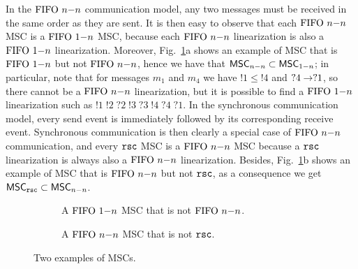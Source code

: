 In the $\text{FIFO } n\mathsf{-}n$ communication model, any two messages must be received in the same order as they are sent. It is then easy to observe that each $\text{FIFO } n\mathsf{-}n$ MSC is a $\text{FIFO } 1\mathsf{-}n$ MSC, because each $\text{FIFO } n\mathsf{-}n$ linearization is also a $\text{FIFO } 1\mathsf{-}n$ linearization. Moreover, Fig.~\ref{fig:onen_nn_rsc_ex}a shows an example of MSC that is $\text{FIFO } 1\mathsf{-}n$ but not $\text{FIFO } n\mathsf{-}n$, hence we have that $\mathsf{MSC}_{n\mathsf{-}n} \subset \mathsf{MSC}_{1\mathsf{-}n}$; in particular, note that for messages $m_1$ and $m_4$ we have $!1 \le !4$ and $?4 \to ?1$, so there cannot be a $\text{FIFO } n\mathsf{-}n$ linearization, but it is possible to find a $\text{FIFO } 1\mathsf{-}n$ linearization such as $!1\;!2\;?2\;!3\;?3\;!4\;?4\;?1$. In the synchronous communication model, every send event is immediately followed by its corresponding receive event. Synchronous communication is then clearly a special case of $\text{FIFO } n\mathsf{-}n$ communication, and every $\mathtt{rsc}$ MSC is a $\text{FIFO } n\mathsf{-}n$ MSC because a $\mathtt{rsc}$ linearization is always also a $\text{FIFO } n\mathsf{-}n$ linearization. Besides, Fig.~\ref{fig:onen_nn_rsc_ex}b shows an example of MSC that is $\text{FIFO } n\mathsf{-}n$ but not $\mathtt{rsc}$, as a consequence we get $\mathsf{MSC}_{\mathtt{rsc}} \subset \mathsf{MSC}_{n\mathsf{-}n}$.

\begin{figure}[h]
	\captionsetup[subfigure]{justification=centering}
	\begin{subfigure}[t]{0.45\textwidth}\centering
		\caption{A $\text{FIFO } 1\mathsf{-}n$ MSC that is not $\text{FIFO } n\mathsf{-}n$.}
	\end{subfigure}
	\begin{subfigure}[t]{0.45\textwidth}\centering
		\caption{A $\text{FIFO } n\mathsf{-}n$ MSC that is not $\mathtt{rsc}$.}
	\end{subfigure}
		\caption{Two examples of MSCs.}
	    \label{fig:onen_nn_rsc_ex}
\end{figure}